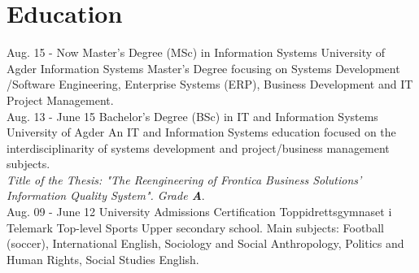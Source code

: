 \documentclass[]{cv-class}
\begin{document}
\section{Education}
\begin{entrylist}
  \entry
    {Aug. 15 - Now}
    {Master's Degree (MSc) in Information Systems}
    {University of Agder}
    {Information Systems Master's Degree focusing on Systems Development
    /Software Engineering, Enterprise Systems (ERP), Business Development and
    IT Project Management.\\}
  \entry
    {Aug. 13 - June 15}
    {Bachelor's Degree (BSc) in IT and Information Systems}
    {University of Agder}
    {An IT and Information Systems education focused on the interdisciplinarity of
    systems development and project/business management subjects.\\
    \emph{Title of the Thesis: "The Reengineering of Frontica Business Solutions'
    Information Quality System". Grade \textbf{A}}.\\}
  \entry
    {Aug. 09 - June 12}
    {University Admissions Certification}
    {Toppidrettsgymnaset i Telemark}
    {Top-level Sports Upper secondary school.
    Main subjects: Football (soccer), International English, Sociology and Social Anthropology,
    Politics and Human Rights, Social Studies English.}
\end{entrylist}
\end{document}
